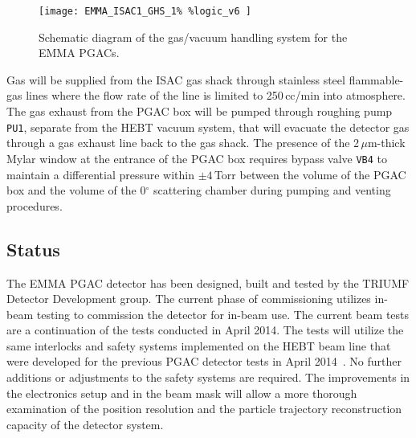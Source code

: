 
\begin{figure}[t]
\centerline{
\texttt{[image: EMMA\_ISAC1\_GHS\_1\%
\%logic\_v6
]}
}
\caption{Schematic diagram of the gas/vacuum handling system for the EMMA PGACs.
}
\label{diagram}
\end{figure}

Gas will be supplied from the ISAC gas shack through stainless steel flammable-gas lines where the
flow rate of the line is limited to 250\,cc/min into atmosphere. The gas exhaust from the
PGAC box will be pumped through roughing pump \texttt{PU1}, separate from the HEBT vacuum system, that will evacuate the detector gas through a gas exhaust line back to the gas shack.
The presence of the 2\,$\mu$m-thick Mylar window at the entrance of the PGAC box requires bypass valve \texttt{VB4}
to maintain a differential pressure within $\pm 4$\,Torr between the volume of the PGAC box and the volume of  the 0$^\circ$ scattering chamber
during pumping and venting procedures.

\subsection{Status}
The EMMA PGAC detector has been designed, built and tested by the TRIUMF Detector Development group.  The current phase of commissioning utilizes in-beam testing to commission the detector for in-beam use. %
The current beam tests are a continuation of the tests conducted in April 2014.
The tests will utilize the same interlocks and safety systems implemented on the HEBT beam line that were developed for the previous PGAC detector tests in April 2014~\cite{old_safety}. No further additions or adjustments to the safety systems are required.
The improvements in the electronics setup and in the beam mask will %
 allow a more thorough examination of the position resolution and the particle trajectory reconstruction capacity of the detector system. %

